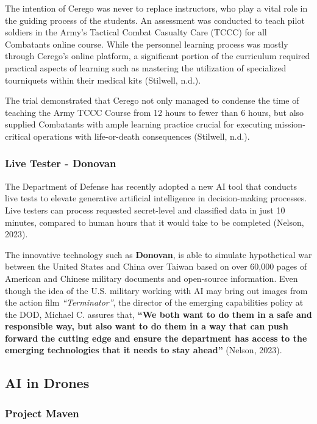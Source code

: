 \documentclass[
]{article}
\begin{document}
The intention of Cerego was never to replace instructors, who play a vital role in the guiding process of the students. An assessment was conducted to teach pilot soldiers in the Army's Tactical Combat Casualty Care (TCCC) for all Combatants online course. While the personnel learning process was mostly through Cerego's online platform, a significant portion of the curriculum required practical aspects of learning such as mastering the utilization of specialized tourniquets within their medical kits (Stilwell, n.d.).

The trial demonstrated that Cerego not only managed to condense the time of teaching the Army TCCC Course from 12 hours to fewer than 6 hours, but also supplied Combatants with ample learning practice crucial for executing mission-critical operations with life-or-death consequences (Stilwell, n.d.).

\hypertarget{live-tester---donovan}{%
\subsubsection{Live Tester - Donovan}\label{live-tester---donovan}}

The Department of Defense has recently adopted a new AI tool that conducts live tests to elevate generative artificial intelligence in decision-making processes. Live testers can process requested secret-level and classified data in just 10 minutes, compared to human hours that it would take to be completed (Nelson, 2023).

The innovative technology such as \textbf{Donovan}, is able to simulate hypothetical war between the United States and China over Taiwan based on over 60,000 pages of American and Chinese military documents and open-source information. Even though the idea of the U.S. military working with AI may bring out images from the action film \emph{``Terminator''}, the director of the emerging capabilities policy at the DOD, Michael C. assures that, \textbf{``We both want to do them in a safe and responsible way, but also want to do them in a way that can push forward the cutting edge and ensure the department has access to the emerging technologies that it needs to stay ahead''} (Nelson, 2023).

\hypertarget{ai-in-drones}{%
\subsection{AI in Drones}\label{ai-in-drones}}

\hypertarget{project-maven}{%
\subsubsection{Project Maven}\label{project-maven}}
\end{document}
